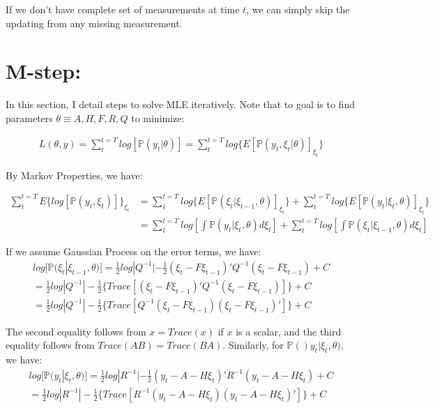 \documentclass[12pt]{article}
\numberwithin{equation}{section}
\begin{document}
If we don't have complete set of measurements at time $t$, we can simply skip the updating from any missing measurement.

\section{M-step:} \label{sec:M}

In this section, I detail steps to solve MLE iteratively. Note that to goal is to find parameters $\theta \equiv {A, H, F, R, Q}$ to minimize:

\begin{align}
    L(\theta,y) = \sum_t^{t=T}log[\mathbb{P}(y_t|\theta)] = \sum_t^{t=T}log\{E[\mathbb{P}(y_t,\xi_t|\theta)]_{\xi_t}\} \label{eq:MLE}
\end{align} 

By Markov Properties, we have: 

\begin{align}
    \sum_t^{t=T}E\{log[\mathbb{P}(y_t,\xi_t)]\}_{\xi_t} &= \sum_t^{t=T}log\{E[\mathbb{P}(\xi_t|\xi_{t-1},\theta)]_{\xi_t}\}
    + \sum_t^{t=T}log\{E[\mathbb{P}(y_t|\xi_t, \theta)]_{\xi_t}\} \nonumber \\
    & = \sum_t^{t=T}log\left[\int\mathbb{P}(y_t|\xi_t,\theta)d\xi_t\right]
    + \sum_t^{t=T}log\left[\int\mathbb{P}(\xi_t|\xi_{t-1},\theta)d\xi_t\right] \nonumber 
\end{align}

If we assume Gaussian Process on the error terms, we have:
\begin{align}
    log[\mathbb{P}(\xi_t|\xi_{t-1},\theta)] = \frac{1}{2}log|Q^{-1}|-\frac{1}{2}(\xi_t-F\xi_{t-1})'Q^{-1}(\xi_t-F\xi_{t-1}) + C \nonumber \\
    = \frac{1}{2}log|Q^{-1}|-\frac{1}{2}\{Trace[(\xi_t-F\xi_{t-1})'Q^{-1}(\xi_t-F\xi_{t-1})]\} + C \nonumber \\
    = \frac{1}{2}log|Q^{-1}|-\frac{1}{2}\{Trace[Q^{-1}(\xi_t-F\xi_{t-1})(\xi_t-F\xi_{t-1})']\} + C \label{eq:mle_xi}
\end{align}

The second equality follows from $x = Trace(x)$ if $x$ is a scalar, and the third equality follows from $Trace(AB) = Trace(BA)$. Similarly, for $\mathbb{P}()y_t|\xi_{t},\theta)$, we have:
\begin{align}
    log[\mathbb{P}(y_t|\xi_{t},\theta)] = \frac{1}{2}log|R^{-1}|-\frac{1}{2}(y_t-A-H\xi_t)'R^{-1}(y_t-A-H\xi_t) + C \nonumber \\
    = \frac{1}{2}log|R^{-1}|-\frac{1}{2}\{Trace[R^{-1}(y_t-A-H\xi_{t})(y_t-A-H\xi_{t})']\} + C \label{eq:mle_y} 
\end{align}
\end{document}
